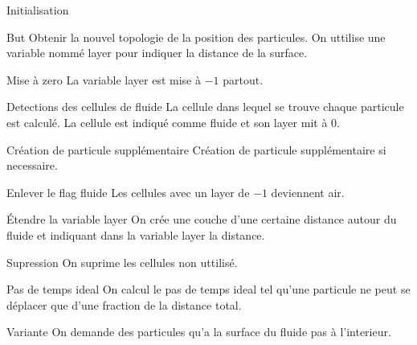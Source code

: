 \begin{frame}[shrink]{Initialisation}
 
 \begin{block}{But}
  Obtenir la nouvel topologie de la position des particules.
  On uttilise une variable  nommé layer pour indiquer la distance de la surface.
 \end{block}
 \begin{block}{Mise à zero}
  La variable layer est mise à $-1$ partout.
 \end{block}
 
 \begin{block}{Detections des cellules de fluide}
  La cellule dans lequel se trouve chaque particule est calculé. La cellule est indiqué comme fluide et son layer mit à $0$.
 \end{block}
 
  \begin{block}{Création de particule supplémentaire}
  Création de particule supplémentaire si necessaire.
 \end{block}
 
 \begin{block}{Enlever le flag fluide}
  Les cellules avec un layer de $-1$ deviennent air.
 \end{block}
 
 \begin{block}{Étendre la variable layer}
  On crée une couche d'une certaine distance autour du fluide et indiquant dans la variable layer la distance.
 \end{block}

 \begin{block}{Supression}
  On suprime les cellules non uttilisé.
 \end{block}

 \begin{block}{Pas de temps ideal}
  On calcul le pas de temps ideal tel qu'une particule ne peut se déplacer que d'une fraction de la distance total.
 \end{block}
\begin{block}{Variante}
 On demande des particules qu'a la surface du fluide pas à l'interieur.
\end{block}


\end{frame}



